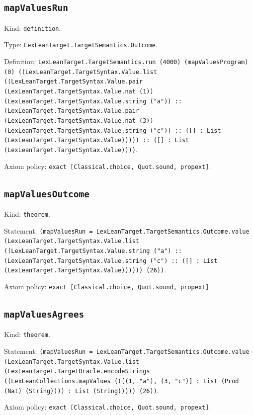 \documentclass[11pt]{article}
\begin{document}
\subsection*{\texttt{mapValuesRun}}
\noindent Kind: \texttt{definition}.\par
\noindent Type: \texttt{LexLeanTarget.TargetSemantics.Outcome}.\par
\noindent Definition: \texttt{LexLeanTarget.TargetSemantics.run (4000) (mapValuesProgram) (0) ((LexLeanTarget.TargetSyntax.Value.list ((LexLeanTarget.TargetSyntax.Value.pair (LexLeanTarget.TargetSyntax.Value.nat (1)) (LexLeanTarget.TargetSyntax.Value.string ("a")) :: (LexLeanTarget.TargetSyntax.Value.pair (LexLeanTarget.TargetSyntax.Value.nat (3)) (LexLeanTarget.TargetSyntax.Value.string ("c")) :: ([] : List (LexLeanTarget.TargetSyntax.Value))))) :: ([] : List (LexLeanTarget.TargetSyntax.Value))))}.\par
\noindent Axiom policy: \texttt{exact [Classical.choice, Quot.sound, propext]}.\par
\subsection*{\texttt{mapValuesOutcome}}
\noindent Kind: \texttt{theorem}.\par
\noindent Statement: \texttt{(mapValuesRun = LexLeanTarget.TargetSemantics.Outcome.value (LexLeanTarget.TargetSyntax.Value.list ((LexLeanTarget.TargetSyntax.Value.string ("a") :: (LexLeanTarget.TargetSyntax.Value.string ("c") :: ([] : List (LexLeanTarget.TargetSyntax.Value)))))) (26))}.\par
\noindent Axiom policy: \texttt{exact [Classical.choice, Quot.sound, propext]}.\par
\subsection*{\texttt{mapValuesAgrees}}
\noindent Kind: \texttt{theorem}.\par
\noindent Statement: \texttt{(mapValuesRun = LexLeanTarget.TargetSemantics.Outcome.value (LexLeanTarget.TargetSyntax.Value.list (LexLeanTarget.TargetOracle.encodeStrings ((LexLeanCollections.mapValues (([(1, "a"), (3, "c")] : List (Prod (Nat) (String)))) : List (String))))) (26))}.\par
\noindent Axiom policy: \texttt{exact [Classical.choice, Quot.sound, propext]}.\par
\end{document}
